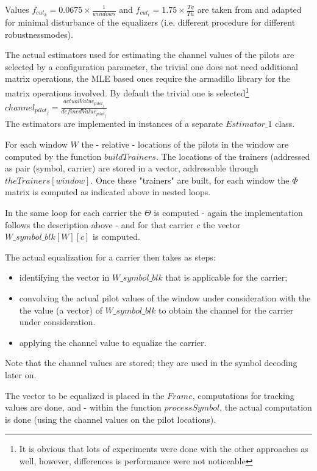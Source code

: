\documentclass[11pt]{article}
\begin{document}
Values
$f_{cut_k} = 0.0675 \times \frac{1}{windows}$ and
$f_{cut_t} = 1.75 \times \frac{Tg}{Tu}$
are taken from \cite{Diorama} and
adapted for minimal disturbance of the equalizers (i.e. different procedure
for different robustnessmodes).

The actual estimators used for estimating the channel values of
the pilots are selected by a configuration parameter,
the trivial one does not need additional matrix operations, the MLE based
ones require the armadillo library\cite{armadillo} for the
matrix operations involved. By default the trivial one is selected\footnote{It is obvious that lots of experiments were done with the other approaches as well, however, differences is performance were not noticeable}
\ \\
$channel_{pilot_j} = \frac{actualValue_{pilot_j}}{definedValue_{pilot_j}}$
\ \\
The estimators are implemented in instances of a separate
$Estimator\_1$ class.

For each window $W$ the - relative - locations of the pilots in the window
are computed by the function $buildTrainers$. The locations
of the trainers (addressed as pair (symbol, carrier) are stored
in a vector, addressable through $theTrainers [window]$.
Once these "trainers" are built, for each window
the $\Phi$ matrix is computed as indicated above in nested loops.

In the same loop for each carrier the $\Theta$ is computed -
again the implementation follows the description above -
and for that carrier $c$
the vector $W\_symbol\_blk [W][c]$ is computed.

The actual equalization for a carrier then
takes as steps:
\begin{itemize}
\item identifying the vector in $W\_symbol\_blk$ that is applicable 
for the carrier;
\item convolving the actual pilot values of the window under consideration
with the the value (a vector) of $W\_symbol\_blk$ to obtain the
channel for the carrier under consideration.
\item applying the channel value to equalize the carrier.
\end{itemize}
Note that the channel values are stored; they are used in the symbol decoding 
later on.

The vector to be equalized
is placed in the $Frame$,
computations for tracking values are done, and
- within the function $processSymbol$, the actual 
computation is done (using the channel values on the pilot locations).
\end{document}
